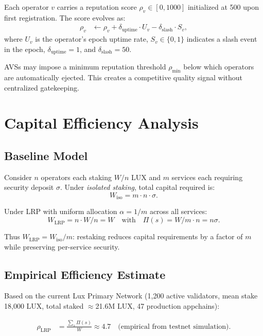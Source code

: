 \documentclass[11pt]{article}
\begin{document}
Each operator $v$ carries a reputation score $\rho_v \in [0, 1000]$ initialized at 500
upon first registration. The score evolves as:
\begin{align}
  \rho_v &\leftarrow \rho_v + \delta_{\text{uptime}} \cdot U_v - \delta_{\text{slash}} \cdot S_v,
\end{align}
where $U_v$ is the operator's epoch uptime rate, $S_v \in \{0,1\}$ indicates a slash event
in the epoch, $\delta_{\text{uptime}} = 1$, and $\delta_{\text{slash}} = 50$.

AVSs may impose a minimum reputation threshold $\rho_{\min}$ below which operators are
automatically ejected. This creates a competitive quality signal without centralized
gatekeeping.

\section{Capital Efficiency Analysis}
\label{sec:efficiency}

\subsection{Baseline Model}

Consider $n$ operators each staking $W/n$ LUX and $m$ services each requiring security
deposit $\sigma$. Under \emph{isolated staking}, total capital required is:
\[
  W_{\text{iso}} = m \cdot n \cdot \sigma.
\]

Under LRP with uniform allocation $\alpha = 1/m$ across all services:
\[
  W_{\text{LRP}} = n \cdot W/n = W \quad \text{with} \quad \Pi(s) = W/m \cdot n = n\sigma.
\]

Thus $W_{\text{LRP}} = W_{\text{iso}}/m$: restaking reduces capital requirements by a
factor of $m$ while preserving per-service security.

\subsection{Empirical Efficiency Estimate}

Based on the current Lux Primary Network (1,200 active validators, mean stake 18,000 LUX,
total staked $\approx$21.6M LUX, 47 production appchains):

\begin{align}
  \rho_{\text{LRP}} &= \frac{\sum_s \Pi(s)}{W} \approx 4.7 \quad\text{(empirical from testnet simulation)}.
\end{align}
\end{document}
